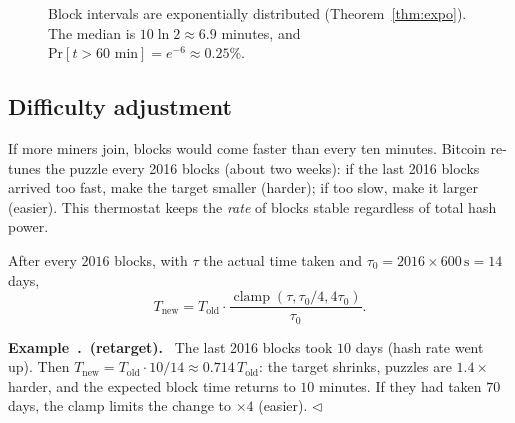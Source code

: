 \documentclass[11pt,a4paper]{article}
\newcounter{exn}[section]
\renewcommand{\theexn}{\thesection.\arabic{exn}}
\newenvironment{plainenglish}{\par\smallskip}{\par\smallskip}
\newenvironment{formal}{\par\smallskip}{\par\smallskip}
\newenvironment{exbox}[1][]{\par\medskip\refstepcounter{exn}\noindent\textbf{Example~\theexn\if\relax\detokenize{#1}\relax\else\ (#1)\fi.}\ \ignorespaces}{\hfill$\triangleleft$\par\medskip}
\theoremstyle{definition}
\theoremstyle{plain}
\theoremstyle{remark}
\renewcommand{\Pr}{\mathrm{Pr}}
\begin{document}
\begin{figure}[htbp]
\centering
{}
\caption{Block intervals are exponentially distributed (Theorem~\ref{thm:expo}). The median is $10\ln2\approx6.9$ minutes, and $\Pr[t>60\text{ min}]=e^{-6}\approx0.25\%$.}
\end{figure}

\subsection{Difficulty adjustment}

\begin{plainenglish}
If more miners join, blocks would come faster than every ten minutes. Bitcoin re-tunes the puzzle every 2016 blocks (about two weeks): if the last 2016 blocks arrived too fast, make the target smaller (harder);
if too slow, make it larger (easier). This thermostat keeps the \emph{rate} of blocks stable regardless of total hash power.
\end{plainenglish}

\begin{formal}
After every $2016$ blocks, with $\tau$ the actual time taken and $\tau_0=2016\times600\,\text{s}=14$ days,
$$T_{\text{new}}=T_{\text{old}}\cdot\frac{\operatorname{clamp}(\tau,\tau_0/4,4\tau_0)}{\tau_0}.$$
\end{formal}

\begin{exbox}[retarget]\label{ex:retarget}
The last 2016 blocks took $10$ days (hash rate went up). Then $T_{\text{new}}=T_{\text{old}}\cdot10/14\approx0.714\,T_{\text{old}}$: the target shrinks, puzzles are $1.4\times$ harder, and the expected block time returns to $10$ minutes.
If they had taken $70$ days, the clamp limits the change to $\times4$ (easier).
\end{exbox}
\end{document}
